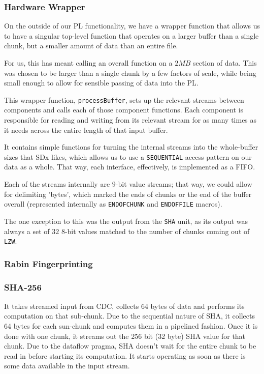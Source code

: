 \documentclass{article}
\begin{document}

\subsubsection{Hardware Wrapper}

On the outside of our PL functionality, we have a wrapper function that allows us to have a singular top-level function that operates on a larger buffer than a single chunk, but a smaller amount of data than an entire file.
\par
For us, this has meant calling an overall function on a $2{MB}$ section of data. This was chosen to be larger than a single chunk by a few factors of scale, while being small enough to allow for sensible passing of data into the PL.
\newline\par
This wrapper function, \texttt{processBuffer}, sets up the relevant streams between components and calls each of those component functions. 
Each component is responsible for reading and writing from its relevant stream for as many times as it needs across the entire length of that input buffer.
\par
It contains simple functions for turning the internal streams into the whole-buffer sizes that SDx likes, which allows us to use a \texttt{SEQUENTIAL} access pattern on our data as a whole. That way, each interface, effectively, is implemented as a FIFO.
\newline\par
Each of the streams internally are $9$-bit value streams; that way, we could allow for delimiting 'bytes', which marked the ends of chunks or the end of the buffer overall (represented internally as \texttt{ENDOFCHUNK} and \texttt{ENDOFFILE} macros).
\par
The one exception to this was the output from the \texttt{SHA} unit, as its output was always a set of $32$ 8-bit values matched to the number of chunks coming out of \texttt{LZW}.

\subsubsection{Rabin Fingerprinting}

\subsubsection{SHA-256}
It takes streamed input from CDC, collects 64 bytes of data and performs its computation on that sub-chunk. Due to the sequential nature of SHA, it collects 64 bytes for each sun-chunk and computes them in a pipelined fashion. Once it is done with one chunk, it streams out the 256 bit (32 byte) SHA value for that chunk. Due to the dataflow pragma, SHA doesn't wait for the entire chunk to be read in before starting its computation. It starts operating as soon as there is some data available in the input stream.
\end{document}
